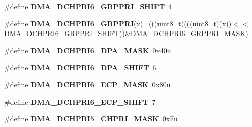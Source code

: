 \begin{DoxyCompactItemize}
\item 
\hypertarget{group___d_m_a___register___masks_gaab23c78d97f636c4d3ad2e02fde5b106}{}\#define {\bfseries D\+M\+A\+\_\+\+D\+C\+H\+P\+R\+I6\+\_\+\+G\+R\+P\+P\+R\+I\+\_\+\+S\+H\+I\+F\+T}~4\label{group___d_m_a___register___masks_gaab23c78d97f636c4d3ad2e02fde5b106}

\item 
\hypertarget{group___d_m_a___register___masks_gaf897ad78c5ac1f1e9e8b0ec4f38ef336}{}\#define {\bfseries D\+M\+A\+\_\+\+D\+C\+H\+P\+R\+I6\+\_\+\+G\+R\+P\+P\+R\+I}(x)                                    ~(((uint8\+\_\+t)(((uint8\+\_\+t)(x))$<$$<$D\+M\+A\+\_\+\+D\+C\+H\+P\+R\+I6\+\_\+\+G\+R\+P\+P\+R\+I\+\_\+\+S\+H\+I\+F\+T))\&D\+M\+A\+\_\+\+D\+C\+H\+P\+R\+I6\+\_\+\+G\+R\+P\+P\+R\+I\+\_\+\+M\+A\+S\+K)\label{group___d_m_a___register___masks_gaf897ad78c5ac1f1e9e8b0ec4f38ef336}

\item 
\hypertarget{group___d_m_a___register___masks_gaf4b1d9494691bb0d118593c119789378}{}\#define {\bfseries D\+M\+A\+\_\+\+D\+C\+H\+P\+R\+I6\+\_\+\+D\+P\+A\+\_\+\+M\+A\+S\+K}~0x40u\label{group___d_m_a___register___masks_gaf4b1d9494691bb0d118593c119789378}

\item 
\hypertarget{group___d_m_a___register___masks_gaeb900ebd7efd790f06ce39a68735defa}{}\#define {\bfseries D\+M\+A\+\_\+\+D\+C\+H\+P\+R\+I6\+\_\+\+D\+P\+A\+\_\+\+S\+H\+I\+F\+T}~6\label{group___d_m_a___register___masks_gaeb900ebd7efd790f06ce39a68735defa}

\item 
\hypertarget{group___d_m_a___register___masks_gaa5c231f95cecf67801dc43ea987a5caf}{}\#define {\bfseries D\+M\+A\+\_\+\+D\+C\+H\+P\+R\+I6\+\_\+\+E\+C\+P\+\_\+\+M\+A\+S\+K}~0x80u\label{group___d_m_a___register___masks_gaa5c231f95cecf67801dc43ea987a5caf}

\item 
\hypertarget{group___d_m_a___register___masks_ga467da6c912746a19226a13ba1d2ff1c1}{}\#define {\bfseries D\+M\+A\+\_\+\+D\+C\+H\+P\+R\+I6\+\_\+\+E\+C\+P\+\_\+\+S\+H\+I\+F\+T}~7\label{group___d_m_a___register___masks_ga467da6c912746a19226a13ba1d2ff1c1}

\item 
\hypertarget{group___d_m_a___register___masks_ga4f7ea16f3982b598833ea289b6af08e1}{}\#define {\bfseries D\+M\+A\+\_\+\+D\+C\+H\+P\+R\+I5\+\_\+\+C\+H\+P\+R\+I\+\_\+\+M\+A\+S\+K}~0x\+Fu\label{group___d_m_a___register___masks_ga4f7ea16f3982b598833ea289b6af08e1}


\end{DoxyCompactItemize}
